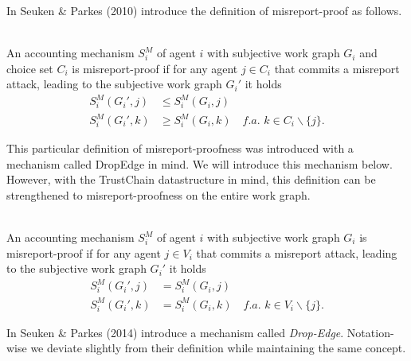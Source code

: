 \noindent{}In \cite{Accounting Mechanisms for Distributed Work Systems} Seuken \& Parkes (2010) introduce the definition of misreport-proof as follows.\vspace{1em}\\

\begin{definition}\ \\
\label{def:Misreport-Proofness on the Choice Set}
An accounting mechanism $S^M_i$ of agent $i$ with subjective work graph $G_i$ and choice set $C_i$ is misreport-proof if for any agent $j\in{}C_i$ that commits a misreport attack, leading to the subjective work graph $G_i'$ it holds
\begin{align*}
S_i^M(G_i',j)&\leq{}S_i^M(G_i,j) \\ 
S_i^M(G_i',k)&\geq{}S_i^M(G_i,k)\quad\textit{f.a. }k\in{}C_i\backslash\lbrace{}j\rbrace .
\end{align*}
\end{definition}


\noindent{}This particular definition of misreport-proofness was introduced with a mechanism called DropEdge in mind. We will introduce this mechanism below. However, with the TrustChain datastructure in mind, this definition can be strengthened to misreport-proofness on the entire work graph. \vspace{1em}\\

\begin{definition}\ \\
\label{def:Misreport-Proofness}
An accounting mechanism $S^M_i$ of agent $i$ with subjective work graph $G_i$ is misreport-proof if for any agent $j\in{}V_i$ that commits a misreport attack, leading to the subjective work graph $G_i'$ it holds
\begin{align*}
S_i^M(G_i',j)&= S_i^M(G_i,j) \\ 
S_i^M(G_i',k)&= S_i^M(G_i,k)\quad\textit{f.a. }k\in{}V_i\backslash\lbrace{}j\rbrace .
\end{align*}
\end{definition}

\noindent{}In \cite{Sybil-proof Accounting Mechanisms with Transitive Trust} Seuken \& Parkes (2014) introduce a mechanism called {\it Drop-Edge}. Notation-wise we deviate slightly from their definition while maintaining the same concept.\vspace{1em}\\


